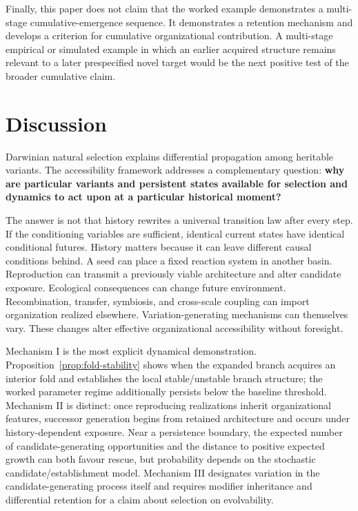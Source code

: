 \documentclass[11pt,a4paper]{article}
\begin{document}
Finally, this paper does not claim that the worked example demonstrates a multi-stage cumulative-emergence sequence. It demonstrates a retention mechanism and develops a criterion for cumulative organizational contribution. A multi-stage empirical or simulated example in which an earlier acquired structure remains relevant to a later prespecified novel target would be the next positive test of the broader cumulative claim.

\section{Discussion}

Darwinian natural selection explains differential propagation among heritable variants. The accessibility framework addresses a complementary question: \textbf{why are particular variants and persistent states available for selection and dynamics to act upon at a particular historical moment?}

The answer is not that history rewrites a universal transition law after every step. If the conditioning variables are sufficient, identical current states have identical conditional futures. History matters because it can leave different causal conditions behind. A seed can place a fixed reaction system in another basin. Reproduction can transmit a previously viable architecture and alter candidate exposure. Ecological consequences can change future environment. Recombination, transfer, symbiosis, and cross-scale coupling can import organization realized elsewhere. Variation-generating mechanisms can themselves vary. These changes alter effective organizational accessibility without foresight.

Mechanism I is the most explicit dynamical demonstration. Proposition~\ref{prop:fold-stability} shows when the expanded branch acquires an interior fold and establishes the local stable/unstable branch structure; the worked parameter regime additionally persists below the baseline threshold. Mechanism II is distinct: once reproducing realizations inherit organizational features, successor generation begins from retained architecture and occurs under history-dependent exposure. Near a persistence boundary, the expected number of candidate-generating opportunities and the distance to positive expected growth can both favour rescue, but probability depends on the stochastic candidate/establishment model. Mechanism III designates variation in the candidate-generating process itself and requires modifier inheritance and differential retention for a claim about selection on evolvability.
\end{document}

